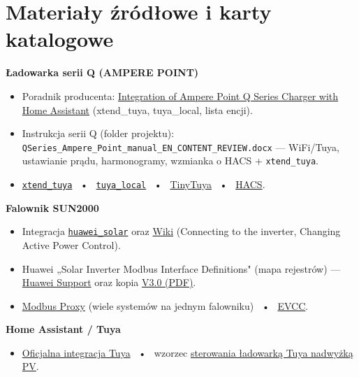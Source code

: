 \documentclass[11pt]{article}
\begin{document}
\section{Materiały źródłowe i karty katalogowe}
\textbf{Ładowarka serii Q (AMPERE POINT)}
\begin{itemize}
\item Poradnik producenta: \href{https://www.amperepoint.com/blogs/poradniki/integration-of-ampere-point-q-series-charger-with-home-assistant}{Integration of Ampere Point Q Series Charger with Home Assistant} (xtend\_tuya, tuya\_local, lista encji).
\item Instrukcja serii Q (folder projektu): \texttt{QSeries\_Ampere\_Point\_manual\_EN\_CONTENT\_REVIEW.docx} — WiFi/Tuya, ustawianie prądu, harmonogramy, wzmianka o HACS + \texttt{xtend\_tuya}.
\item \href{https://github.com/azerty9971/xtend_tuya}{\texttt{xtend\_tuya}} \, • \, \href{https://github.com/make-all/tuya-local}{\texttt{tuya\_local}} \, • \, \href{https://github.com/jasonacox/tinytuya}{TinyTuya} \, • \, \href{https://hacs.xyz/docs/setup/download/}{HACS}.
\end{itemize}
\textbf{Falownik SUN2000}
\begin{itemize}
\item Integracja \href{https://github.com/wlcrs/huawei_solar}{\texttt{huawei\_solar}} oraz \href{https://github.com/wlcrs/huawei_solar/wiki}{Wiki} (Connecting to the inverter, Changing Active Power Control).
\item Huawei „Solar Inverter Modbus Interface Definitions" (mapa rejestrów) — \href{https://support.huawei.com/enterprise/en/doc/EDOC1100480329}{Huawei Support} oraz kopia \href{https://community.symcon.de/uploads/short-url/pqZXWOienoBK2AsEzGD2oH1bcPR.pdf}{V3.0 (PDF)}.
\item \href{https://github.com/Akulatraxas/ha-modbusproxy}{Modbus Proxy} (wiele systemów na jednym falowniku) \, • \, \href{https://evcc.io/}{EVCC}.
\end{itemize}
\textbf{Home Assistant / Tuya}
\begin{itemize}
\item \href{https://www.home-assistant.io/integrations/tuya/}{Oficjalna integracja Tuya} \, • \, wzorzec \href{https://community.home-assistant.io/t/turn-your-tuya-ev-charger-dynamic-load-balancing-or-solar-controlled/854072}{sterowania ładowarką Tuya nadwyżką PV}.
\end{itemize}
\end{document}
